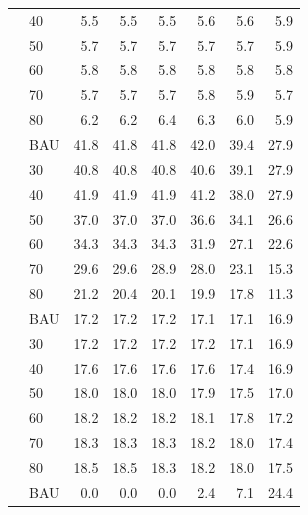 \documentclass[]{article}
\begin{document}
\begin{longtable}{>{\raggedright\arraybackslash}p{2 cm}lrrrrrr}
\rowcolor{gray!6}   & 40 & 5.5 & 5.5 & 5.5 & 5.6 & 5.6 & 5.9\\

 & 50 & 5.7 & 5.7 & 5.7 & 5.7 & 5.7 & 5.9\\

\rowcolor{gray!6}   & 60 & 5.8 & 5.8 & 5.8 & 5.8 & 5.8 & 5.8\\

 & 70 & 5.7 & 5.7 & 5.7 & 5.8 & 5.9 & 5.7\\

\rowcolor{gray!6}  \multirow{-7}{2 cm}{\raggedright\arraybackslash Hydro} & 80 & 6.2 & 6.2 & 6.4 & 6.3 & 6.0 & 5.9\\
\cmidrule{1-8}
 & BAU & 41.8 & 41.8 & 41.8 & 42.0 & 39.4 & 27.9\\

\rowcolor{gray!6}   & 30 & 40.8 & 40.8 & 40.8 & 40.6 & 39.1 & 27.9\\

 & 40 & 41.9 & 41.9 & 41.9 & 41.2 & 38.0 & 27.9\\

\rowcolor{gray!6}   & 50 & 37.0 & 37.0 & 37.0 & 36.6 & 34.1 & 26.6\\

 & 60 & 34.3 & 34.3 & 34.3 & 31.9 & 27.1 & 22.6\\

\rowcolor{gray!6}   & 70 & 29.6 & 29.6 & 28.9 & 28.0 & 23.1 & 15.3\\

\multirow{-7}{2 cm}{\raggedright\arraybackslash Natural Gas} & 80 & 21.2 & 20.4 & 20.1 & 19.9 & 17.8 & 11.3\\
\cmidrule{1-8}
\rowcolor{gray!6}   & BAU & 17.2 & 17.2 & 17.2 & 17.1 & 17.1 & 16.9\\

 & 30 & 17.2 & 17.2 & 17.2 & 17.2 & 17.1 & 16.9\\

\rowcolor{gray!6}   & 40 & 17.6 & 17.6 & 17.6 & 17.6 & 17.4 & 16.9\\

 & 50 & 18.0 & 18.0 & 18.0 & 17.9 & 17.5 & 17.0\\

\rowcolor{gray!6}   & 60 & 18.2 & 18.2 & 18.2 & 18.1 & 17.8 & 17.2\\

 & 70 & 18.3 & 18.3 & 18.3 & 18.2 & 18.0 & 17.4\\

\rowcolor{gray!6}  \multirow{-7}{2 cm}{\raggedright\arraybackslash Nuclear} & 80 & 18.5 & 18.5 & 18.3 & 18.2 & 18.0 & 17.5\\
\cmidrule{1-8}
 & BAU & 0.0 & 0.0 & 0.0 & 2.4 & 7.1 & 24.4\\


\end{longtable}
\end{document}
